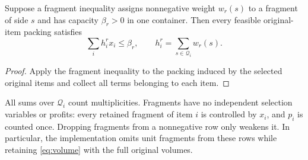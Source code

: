 \begin{proposition}[Grouping]
Suppose a fragment inequality assigns nonnegative weight $w_r(s)$
to a fragment of side $s$ and has capacity $\beta_r>0$ in one
container. Then every feasible original-item packing satisfies
\begin{equation}
 \sum_i h_i^r x_i\leq\beta_r,
 \qquad h_i^r=\sum_{s\in\mathcal Q_i}w_r(s).       \label{eq:grouping}
\end{equation}
\end{proposition}
\begin{proof}
Apply the fragment inequality to the packing induced by the selected
original items and collect all terms belonging to each item.
\end{proof}
All sums over $\mathcal Q_i$ count multiplicities. Fragments have no
independent selection variables or profits: every retained fragment
of item $i$ is controlled by $x_i$, and $p_i$ is counted once. Dropping
fragments from a nonnegative row only weakens it. In particular, the
implementation omits unit fragments from these rows while retaining
\eqref{eq:volume} with the full original volumes.

